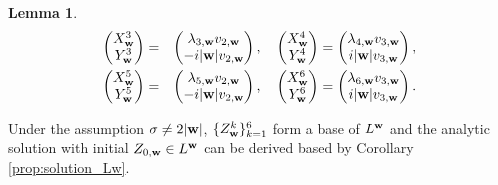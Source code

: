 \documentclass[10pt,reqno]{amsart}
\renewcommand{\(}{\left(}
\renewcommand{\)}{\right)}
\newcommand{\bw}{{\bf w}}
\newtheorem{lem}[theo]{Lemma}
\numberwithin{equation}{section}
\begin{document}
\begin{lem}
\begin{eqnarray*}
		\begin{pmatrix}
			X^3_{\bw}  \\
			Y^3_{\bw} 
		\end{pmatrix} &=& \begin{pmatrix}
			\lambda_{3,\bw} v_{2,\bw}  \\
			-i|\bw|v_{2,\bw}
		\end{pmatrix},\quad
		\begin{pmatrix}
			X^4_{\bw}  \\
			Y^4_{\bw} 
		\end{pmatrix} =\begin{pmatrix}
			\lambda_{4,\bw} v_{3,\bw}  \\
			i|\bw|v_{3,\bw}
		\end{pmatrix}, \label{xy_123456} \\
		\begin{pmatrix}
			X^5_{\bw}  \\
			Y^5_{\bw} 
		\end{pmatrix}&=&
		\begin{pmatrix}
			\lambda_{5,\bw} v_{2,\bw}  \\
			-i|\bw|v_{2,\bw}
		\end{pmatrix}, \quad
		\begin{pmatrix}
			X^6_{\bw}  \\
			Y^6_{\bw} 
		\end{pmatrix} = \begin{pmatrix}
			\lambda_{6,\bw} v_{3,\bw}  \\
			i|\bw|v_{3,\bw}
		\end{pmatrix}. \nonumber
	\end{eqnarray*}
\end{lem}
Under the assumption $\sigma\neq 2|\bw|$,  $\{Z^k_{\bw}\}_{k=1}^6$ form a base of $L^{\bw}$ and the analytic solution with initial $Z_{0,\bw} \in L^{\bw}$ can be derived based by Corollary \ref{prop:solution_Lw}.  
\end{document}
